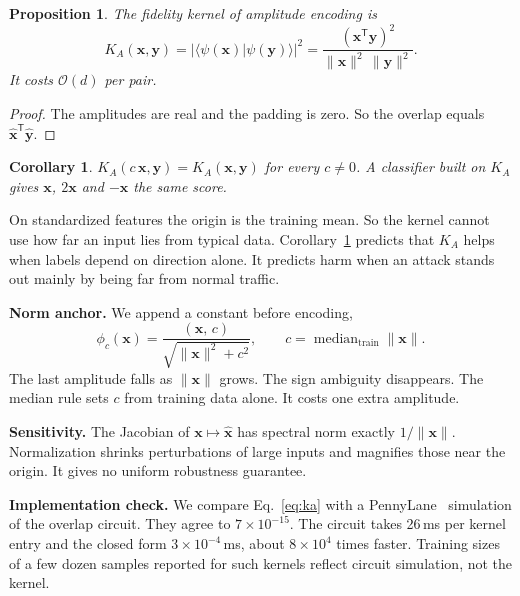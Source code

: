 \documentclass[journal]{IEEEtran}
\newtheorem{proposition}{Proposition}
\newtheorem{corollary}{Corollary}
\begin{document}
\begin{proposition}\label{prop:exact}
The fidelity kernel of amplitude encoding is
\begin{equation}
K_A(\mathbf{x},\mathbf{y}) = |\langle\psi(\mathbf{x})|\psi(\mathbf{y})\rangle|^2
= \frac{(\mathbf{x}^{\mathsf{T}}\mathbf{y})^2}{\|\mathbf{x}\|^2\,\|\mathbf{y}\|^2}.
\label{eq:ka}
\end{equation}
It costs $\mathcal{O}(d)$ per pair.
\end{proposition}
\begin{proof}
The amplitudes are real and the padding is zero. So the overlap equals
$\hat{\mathbf{x}}^{\mathsf{T}}\hat{\mathbf{y}}$.
\end{proof}

\begin{corollary}\label{cor:inv}
$K_A(c\,\mathbf{x},\mathbf{y})=K_A(\mathbf{x},\mathbf{y})$ for every $c\neq0$. A
classifier built on $K_A$ gives $\mathbf{x}$, $2\mathbf{x}$ and $-\mathbf{x}$ the
same score.
\end{corollary}

On standardized features the origin is the training mean. So the kernel cannot
use how far an input lies from typical data. Corollary~\ref{cor:inv} predicts
that $K_A$ helps when labels depend on direction alone. It predicts harm when an
attack stands out mainly by being far from normal traffic.

\textbf{Norm anchor.} We append a constant before encoding,
\begin{equation}
\phi_c(\mathbf{x}) = \frac{(\mathbf{x},\,c)}{\sqrt{\|\mathbf{x}\|^2+c^2}},
\qquad c=\operatorname{median}_{\mathrm{train}}\|\mathbf{x}\| .
\label{eq:anchor}
\end{equation}
The last amplitude falls as $\|\mathbf{x}\|$ grows. The sign ambiguity disappears.
The median rule sets $c$ from training data alone. It costs one extra amplitude.

\textbf{Sensitivity.} The Jacobian of $\mathbf{x}\mapsto\hat{\mathbf{x}}$ has spectral
norm exactly $1/\|\mathbf{x}\|$. Normalization shrinks perturbations of large inputs
and magnifies those near the origin. It gives no uniform robustness guarantee.

\textbf{Implementation check.} We compare Eq.~\eqref{eq:ka} with a
PennyLane~\cite{bergholm2018pennylane} simulation of the overlap circuit. They
agree to $7\times10^{-15}$. The circuit takes 26\,ms per kernel entry and the
closed form $3\times10^{-4}$\,ms, about $8\times10^4$ times faster. Training sizes
of a few dozen samples reported for such kernels reflect circuit simulation, not
the kernel.
\end{document}
